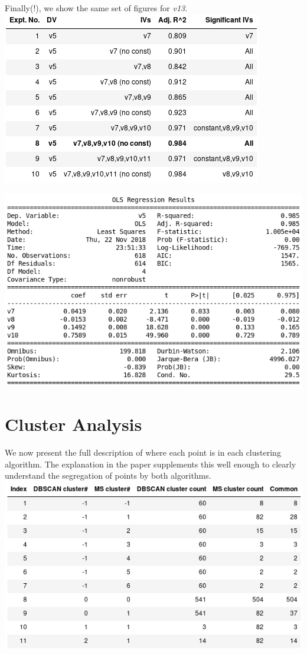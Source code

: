 \documentclass[12pt,a4paper]{article}
\begin{document}
Finally(!), we show the same set of figures for \textit{v13}.\\

\includegraphics[scale=0.5]{v5_sub_reg.png}
\begingroup
{}
\endgroup
\hfill\break

\includegraphics[scale=0.5]{v5_sub_exp.png}
\begingroup
{}
\endgroup

\section{Cluster Analysis}
We now present the full description of where each point is in each clustering algorithm. The explanation in the paper supplements this well enough to clearly understand the segregation of points by both algorithms.\\

\includegraphics[scale=0.65]{clustering.png}
\begingroup
{}
\endgroup
\end{document}
